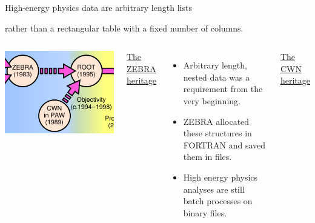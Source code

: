 \documentclass[aspectratio=169]{beamer}
\begin{document}
\begin{frame}[fragile]{High-energy physics data are arbitrary length lists}
\begin{uncoverenv}
\begin{center}
{\begin{minipage}{0.85\linewidth}
\begin{center}
\begin{minipage}{0.85\linewidth}
rather than a rectangular table with a fixed number of columns.
\end{minipage}
\vspace{0.5 cm}
\end{center}
\end{minipage}}
\end{center}
\end{uncoverenv}
\vspace{7 cm}
\end{frame}

\begin{frame}{}
\vspace{1.25 cm}
\begin{columns}[t]
\vspace{1 cm}
\includegraphics[width=\linewidth]{history-cropped.png}

\underline{\large The ZEBRA heritage}

\vspace{0.25 cm}
\begin{itemize}
\item Arbitrary length, nested data was a requirement from the very beginning.
\item ZEBRA allocated these structures in FORTRAN and saved them in files.
\item High energy physics analyses are still batch processes on binary files.
\end{itemize}

\underline{\large The CWN heritage}


\end{columns}
\end{frame}
\end{document}
